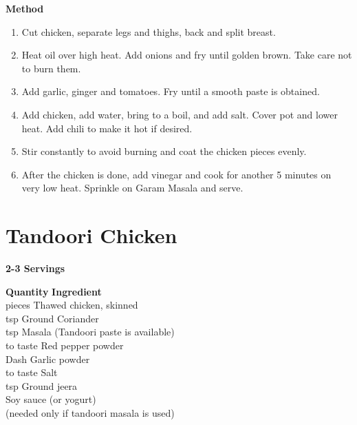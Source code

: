 {\bf Method}
\begin{enumerate}
\item Cut chicken, separate legs and thighs, back and split breast.
\item Heat oil over high heat. Add onions and fry until golden brown. Take care not
to burn them.
\item Add garlic, ginger and tomatoes.  Fry until a smooth paste is obtained.
\item Add chicken, add water, bring to a boil, and add salt.  Cover pot and lower
heat.  Add chili to make it hot if desired.
\item Stir constantly to avoid burning and coat the chicken pieces evenly.
\item After the chicken is done, add vinegar and cook for another 5 minutes on
very low heat.  Sprinkle on Garam Masala and serve.
\end{enumerate}

\section{Tandoori Chicken}
{\bf 2-3 Servings}

\begin{tabbing}
\hspace{1.0cm}  \={\bf Quantity}   \hspace{3.0cm} \={\bf Ingredient}\\

 pieces 	\>Thawed chicken, skinned \\
 tsp	\> Ground Coriander \\
 tsp	\> Masala (Tandoori paste is available) \\
\> to taste	\> Red pepper powder \\
\> Dash		\> Garlic powder\\
\> to taste	\> Salt \\
 tsp	\> Ground jeera \\
\> 		\> Soy sauce (or yogurt)\\
\>		\> (needed only if tandoori masala is used)\\
\end{tabbing} 

